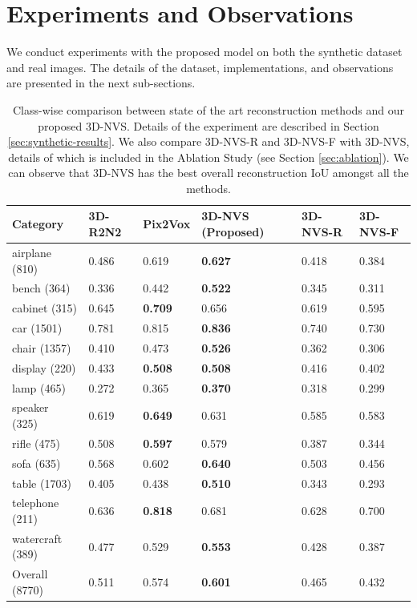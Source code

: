 \section{Experiments and Observations}
\label{sec:experiments}
We conduct experiments with the proposed model on both the synthetic dataset and real images. The details of the dataset, implementations, and observations are presented in the next sub-sections.

\begin{table}
\begin{center}
{\renewcommand{\arraystretch}{1.1} 
\begin{tabular}{P{0.14\textwidth}P{0.12\textwidth}P{0.12\textwidth}P{0.24\textwidth}P{0.11\textwidth}P{0.11\textwidth}}
\hline
Category & 3D-R2N2 \cite{3dr2n2} & Pix2Vox \cite{pix2vox} & 3D-NVS (Proposed) & 3D-NVS-R & 3D-NVS-F\\
\hline
airplane (810) & 0.486 & 0.619 & \textbf{0.627} & 0.418 & 0.384\\
bench (364) & 0.336 & 0.442 & \textbf{0.522} & 0.345 & 0.311\\
cabinet (315) & 0.645 & \textbf{0.709} & 0.656 & 0.619 & 0.595\\
car (1501) & 0.781 & 0.815 & \textbf{0.836} & 0.740 & 0.730\\
chair (1357) & 0.410 & 0.473 & \textbf{0.526} & 0.362 & 0.306\\
display (220) & 0.433 & \textbf{0.508} & \textbf{0.508} & 0.416 & 0.402\\
lamp (465) & 0.272 & 0.365 & \textbf{0.370} & 0.318 & 0.299\\
speaker (325) & 0.619 & \textbf{0.649} & 0.631 & 0.585 & 0.583\\
rifle (475) & 0.508 & \textbf{0.597} & 0.579 & 0.387 & 0.344\\
sofa (635) & 0.568 & 0.602 & \textbf{0.640} & 0.503 & 0.456\\
table (1703) & 0.405 & 0.438 & \textbf{0.510} & 0.343 & 0.293\\
telephone (211) & 0.636 & \textbf{0.818} & 0.681 & 0.628 & 0.700\\
watercraft (389) & 0.477 & 0.529 & \textbf{0.553} & 0.428 & 0.387\\
\hline 
Overall (8770) & 0.511 & 0.574 & \textbf{0.601} & 0.465 & 0.432\\
\hline
\end{tabular}
}
\end{center}
\caption{Class-wise comparison between state of the art reconstruction methods and our proposed 3D-NVS. Details of the experiment are described in Section \ref{sec:synthetic-results}. We also compare 3D-NVS-R and 3D-NVS-F with 3D-NVS, details of which is included in the Ablation Study (see Section \ref{sec:ablation}). We can observe that 3D-NVS has the best overall reconstruction IoU amongst all the methods.}
\label{tab:result}
\end{table}

